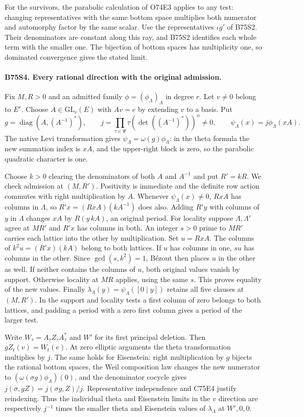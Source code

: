 For the survivors, the parabolic calculation of O74E3 applies to any
test: changing representatives with the same bottom space multiplies
both numerator and automorphy factor by the same scalar. Use the
representatives $\iota g'$ of B75S2. Their denominators are constant
along this ray, and B75S2 identifies each whole term with the smaller
one. The bijection of bottom spaces has multiplicity one, so dominated
convergence gives the stated limit.

\paragraph{B75S4. Every rational direction with the original admission.}
Fix $M,R>0$ and an admitted family $\phi=(\phi_\Lambda)_\Lambda$
in degree $r$. Let $v\ne0$ belong to $E^r$. Choose $A\in
\mathrm{GL}_r(E)$ with $Av=e$ by extending $v$ to a basis. Put
\[
 g=\operatorname{diag}(A,(A^{-1})^*),\qquad
 j=\prod_{\tau\in\Psi}\tau(\det((A^{-1})^*))^n\ne0,\qquad
 \psi_\Lambda(x)=j\phi_\Lambda(xA).
\]
The native Levi transformation gives $\psi_\Lambda=\omega(g)\phi_\Lambda$:
in the theta formula the new summation index is $xA$, and the
upper-right block is zero, so the parabolic quadratic character is one.

Choose $k>0$ clearing the denominators of both $A$ and $A^{-1}$ and
put $R'=kR$. We check admission at $(M,R')$. Positivity is immediate
and the definite row action commutes with right multiplication by
$A$. Whenever $\psi_\Lambda(x)\ne0$, $RxA$ has columns in $\Lambda$,
so $R'x=(RxA)(kA^{-1})$ does also. Adding $R'y$ with columns of $y$
in $\Lambda$ changes $xA$ by $R(y\,kA)$, an original period.
For locality suppose $\Lambda,\Lambda'$ agree at $MR'$ and $R'x$
has columns in both. An integer $s>0$ prime to $MR'$ carries each
lattice into the other by multiplication. Set $u=RxA$. The columns
of $k^2u=(R'x)(kA)$ belong to both lattices. If $u$ has columns in
one, $su$ has columns in the other. Since $\gcd(s,k^2)=1$, B\'ezout
then places $u$ in the other as well. If neither contains the columns
of $u$, both original values vanish by support. Otherwise locality
at $MR$ applies, using the same $s$. This proves equality of the new
values. Finally $\lambda_\Lambda(y)=\psi_\Lambda([0\mid y])$ retains
all five clauses at $(M,R')$. In the support and locality tests a
first column of zero belongs to both lattices, and padding a period
with a zero first column gives a period of the larger test.

Write $W_\tau=A_\tau Z_\tau A_\tau^*$ and $W'$ for its first
principal deletion. Then $gZ_t(v)=W_t(e)$. At zero elliptic
arguments the theta transformation multiplies by $j$. The same holds
for Eisenstein: right multiplication by $g$ bijects the rational
bottom spaces, the Weil composition law changes the new numerator
to $(\omega(\sigma g)\phi_\Lambda)(0)$, and the denominator cocycle
gives $j(\sigma,gZ)=j(\sigma g,Z)/j$. Representative independence
and C75E4 justify reindexing. Thus the individual theta and Eisenstein
limits in the $v$ direction are respectively $j^{-1}$ times the
smaller theta and Eisenstein values of $\lambda_\Lambda$ at $W',0,0$.

